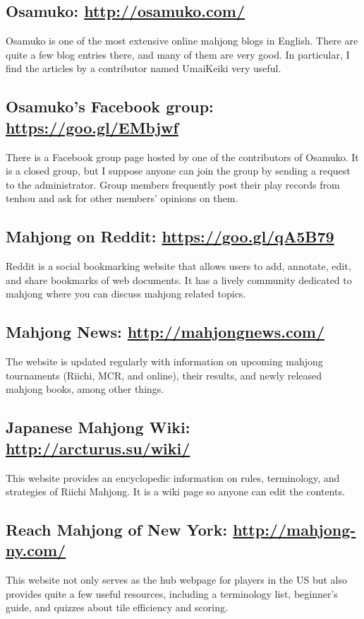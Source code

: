 \subsection*{Osamuko: \url{http://osamuko.com/}} 
Osamuko is one of the most extensive online mahjong blogs in English. There are quite a few blog entries there, and many of them are very good. In particular, I find the articles by a contributor named UmaiKeiki very useful. 

\subsection*{Osamuko's Facebook group: \url{https://goo.gl/EMbjwf}}
There is a Facebook group page hosted by one of the contributors of Osamuko. It is a closed group, but I suppose anyone can join the group by sending a request to the administrator. Group members frequently post their play records from {\jap tenhou} and ask for other members' opinions on them. 

\subsection*{Mahjong on Reddit: \url{https://goo.gl/qA5B79}}
Reddit is a social bookmarking website that allows users to add, annotate, edit, and share bookmarks of web documents. It has a lively community dedicated to mahjong where you can discuss mahjong related topics. 

\subsection*{Mahjong News: \url{http://mahjongnews.com/}}
The website is updated regularly with information on upcoming mahjong tournaments (Riichi, MCR, and online), their results, and newly released mahjong books, among other things. 

\subsection*{Japanese Mahjong Wiki: \url{http://arcturus.su/wiki/}}
This website provides an encyclopedic information on rules, terminology, and strategies of Riichi Mahjong. It is a wiki page so anyone can edit the contents. 

\subsection*{Reach Mahjong of New York: \url{http://mahjong-ny.com/}}
This website not only serves as the hub webpage for players in the US but also provides quite a few useful resources, including a terminology list, beginner's guide, and quizzes about tile efficiency and scoring.


